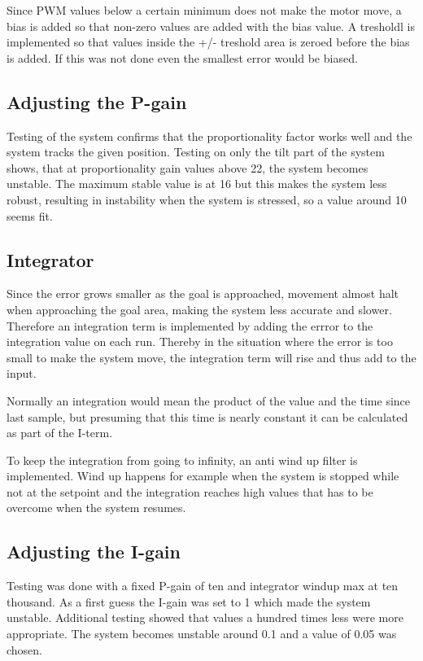 Since PWM values below a certain minimum does not make the motor move, a bias is added so that non-zero values are added with the bias value. A tresholdl is implemented so that values inside the +/- treshold area is zeroed before the bias is added. If this was not done even the smallest error would be biased.

\subsection{Adjusting the P-gain}
Testing of the system confirms that the proportionality factor works well and the system tracks the given position. Testing on only the tilt part of the system shows, that at proportionality gain values above 22, the system becomes unstable. The maximum stable value is at 16 but this makes the system less robust, resulting in instability when the system is stressed, so a value around 10 seems fit.

\subsection{Integrator}
Since the error grows smaller as the goal is approached, movement almost halt when approaching the goal area, making the system less accurate and slower. Therefore an integration term is implemented by adding the errror to the integration value on each run. Thereby in the situation where the error is too small to make the system move, the integration term will rise and thus add to the input. 

Normally an integration would mean the product of the value and the time since last sample, but presuming that this time is nearly constant it can be calculated as part of the I-term. 

To keep the integration from going to infinity, an anti wind up filter is implemented. Wind up happens for example when the system is stopped while not at the setpoint and the integration reaches high values that has to be overcome when the system resumes.

\subsection{Adjusting the I-gain}
Testing was done with a fixed P-gain of ten and integrator windup max at ten thousand. As a first guess the I-gain was set to 1 which made the system unstable. Additional testing showed that values a hundred times less were more appropriate. The system becomes unstable around 0.1 and a value of 0.05 was chosen.

